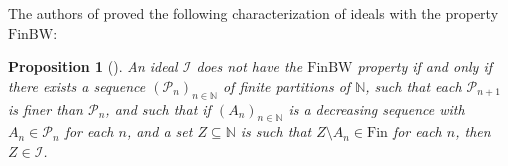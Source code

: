 \documentclass{amsart}
\newtheorem{prop}[thm]{Proposition}
\theoremstyle{definition}
\theoremstyle{definition}
\newcommand{\N}{{\mathbb N}}
\newcommand{\Fin}{\textrm{Fin}}
\newcommand{\I}{\mathcal I}
\newcommand{\finbw}{\text{FinBW}}
\begin{document}
The authors of \cite{BFMS11} proved the following characterization of ideals with the property $\finbw$:
\begin{prop}[{\cite[Proposition 3]{BFMS11}}] \label{tree-fin-bw}
An ideal $\I$ does not have the $\finbw$ property if and only if there exists a sequence $(\mathcal{P}_n)_{n\in\N}$ of finite partitions of $\N$, such that each $\mathcal{P}_{n+1}$ is finer than $\mathcal{P}_n$, 
and such that if $(A_n)_{n\in\N}$ is a decreasing sequence with $A_n \in \mathcal{P}_n$ for each $n$, and a set $Z\subseteq\N$ is such that $Z\setminus A_n \in\Fin$ 
for each $n$, then $Z\in\I$.
%
\end{prop}



\end{document}
